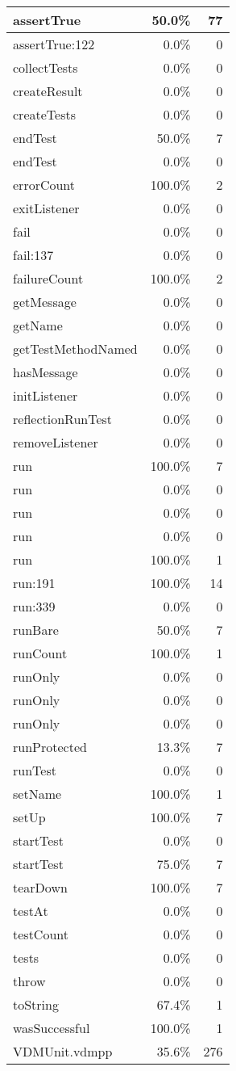 \documentclass[a4paper]{article}
\begin{document}
\begin{longtable}{|l|r|r|}
\hline
assertTrue & 50.0\% & 77 \\
\hline
assertTrue:122 & 0.0\% & 0 \\
\hline
collectTests & 0.0\% & 0 \\
\hline
createResult & 0.0\% & 0 \\
\hline
createTests & 0.0\% & 0 \\
\hline
endTest & 50.0\% & 7 \\
\hline
endTest & 0.0\% & 0 \\
\hline
errorCount & 100.0\% & 2 \\
\hline
exitListener & 0.0\% & 0 \\
\hline
fail & 0.0\% & 0 \\
\hline
fail:137 & 0.0\% & 0 \\
\hline
failureCount & 100.0\% & 2 \\
\hline
getMessage & 0.0\% & 0 \\
\hline
getName & 0.0\% & 0 \\
\hline
getTestMethodNamed & 0.0\% & 0 \\
\hline
hasMessage & 0.0\% & 0 \\
\hline
initListener & 0.0\% & 0 \\
\hline
reflectionRunTest & 0.0\% & 0 \\
\hline
removeListener & 0.0\% & 0 \\
\hline
run & 100.0\% & 7 \\
\hline
run & 0.0\% & 0 \\
\hline
run & 0.0\% & 0 \\
\hline
run & 0.0\% & 0 \\
\hline
run & 100.0\% & 1 \\
\hline
run:191 & 100.0\% & 14 \\
\hline
run:339 & 0.0\% & 0 \\
\hline
runBare & 50.0\% & 7 \\
\hline
runCount & 100.0\% & 1 \\
\hline
runOnly & 0.0\% & 0 \\
\hline
runOnly & 0.0\% & 0 \\
\hline
runOnly & 0.0\% & 0 \\
\hline
runProtected & 13.3\% & 7 \\
\hline
runTest & 0.0\% & 0 \\
\hline
setName & 100.0\% & 1 \\
\hline
setUp & 100.0\% & 7 \\
\hline
startTest & 0.0\% & 0 \\
\hline
startTest & 75.0\% & 7 \\
\hline
tearDown & 100.0\% & 7 \\
\hline
testAt & 0.0\% & 0 \\
\hline
testCount & 0.0\% & 0 \\
\hline
tests & 0.0\% & 0 \\
\hline
throw & 0.0\% & 0 \\
\hline
toString & 67.4\% & 1 \\
\hline
wasSuccessful & 100.0\% & 1 \\
\hline
\hline
VDMUnit.vdmpp & 35.6\% & 276 \\
\hline
\end{longtable}
\end{document}
